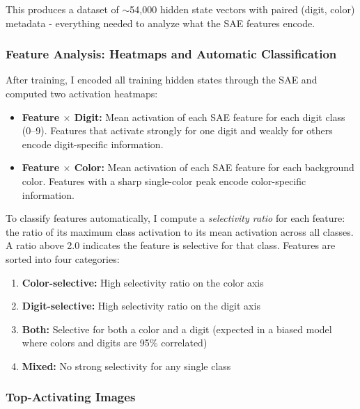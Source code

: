 \documentclass[9pt,a4paper,twocolumn,twoside]{tau-class/tau}
\begin{document}
            This produces a dataset of $\sim$54{,}000 hidden state vectors with paired (digit, color) metadata - everything needed to analyze what the SAE features encode.

        \subsubsection{Feature Analysis: Heatmaps and Automatic Classification}

            After training, I encoded all training hidden states through the SAE and computed two activation heatmaps:

            \begin{itemize}
                \item \textbf{Feature $\times$ Digit:} Mean activation of each SAE feature for each digit class (0--9). Features that activate strongly for one digit and weakly for others encode digit-specific information.
                \item \textbf{Feature $\times$ Color:} Mean activation of each SAE feature for each background color. Features with a sharp single-color peak encode color-specific information.
            \end{itemize}

            To classify features automatically, I compute a \textit{selectivity ratio} for each feature: the ratio of its maximum class activation to its mean activation across all classes. A ratio above 2.0 indicates the feature is selective for that class. Features are sorted into four categories:

            \begin{enumerate}
                \item \textbf{Color-selective:} High selectivity ratio on the color axis
                \item \textbf{Digit-selective:} High selectivity ratio on the digit axis
                \item \textbf{Both:} Selective for both a color and a digit (expected in a biased model where colors and digits are 95\% correlated)
                \item \textbf{Mixed:} No strong selectivity for any single class
            \end{enumerate}

        \subsubsection{Top-Activating Images}
\end{document}
